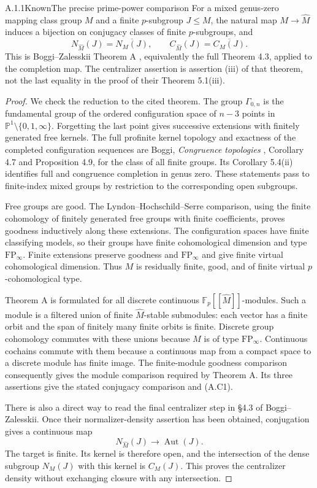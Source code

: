 \begin{result}{A.1.1}{Known}{The precise prime-power comparison}
For a mixed genus-zero mapping class group $M$ and a finite
$p$-subgroup $J\leq M$, the natural map $M\to\widehat M$ induces
a bijection on conjugacy classes of finite $p$-subgroups, and
\[
 N_{\widehat M}(J)=\overline{N_M(J)},\qquad
 C_{\widehat M}(J)=\overline{C_M(J)}.                    \tag{A.C1}
\]
This is Boggi--Zalesskii Theorem A \cite{CA_BZ2025}, equivalently the full
Theorem 4.3, applied to the completion map.  The centralizer assertion
is assertion (iii) of that theorem, not the last equality in the proof
of their Theorem 5.1(iii).
\end{result}
\begin{proof}
We check the reduction to the cited theorem.  The group
$\Gamma_{0,n}$ is the fundamental group of the ordered configuration
space of $n-3$ points in $\mathbb P^1\setminus\{0,1,\infty\}$.
Forgetting the last point gives successive extensions with finitely
generated free kernels.  The full profinite kernel topology and
exactness of the completed configuration sequences are
Boggi, \emph{Congruence topologies} \cite{CA_Boggi2020}, Corollary 4.7 and
Proposition 4.9, for the class of all finite groups.  Its
Corollary 5.4(ii) identifies full and congruence completion in genus
zero.  These statements pass to finite-index mixed groups by
restriction to the corresponding open subgroups.

Free groups are good.  The Lyndon--Hochschild--Serre comparison,
using the finite cohomology of finitely generated free groups with
finite coefficients, proves goodness inductively along these
extensions.  The configuration spaces have finite classifying
models, so their groups have finite cohomological dimension and type
$\mathrm{FP}_\infty$.  Finite extensions preserve goodness and
$\mathrm{FP}_\infty$ and give finite virtual cohomological dimension.
Thus $M$ is residually finite, good, and of finite virtual
$p$-cohomological type.

Theorem A is formulated for all discrete continuous
$\mathbb F_p[[\widehat M]]$-modules.  Such a module is a filtered
union of finite $\widehat M$-stable submodules: each vector has a
finite orbit and the span of finitely many finite orbits is finite.
Discrete group cohomology commutes with these unions because $M$ is
of type $\mathrm{FP}_\infty$.  Continuous cochains commute with them
because a continuous map from a compact space to a discrete module
has finite image.  The finite-module goodness comparison consequently
gives the module comparison required by Theorem A.  Its three
assertions give the stated conjugacy comparison and (A.C1).

There is also a direct way to read the final centralizer step in
\S4.3 of Boggi--Zalesskii.  Once their normalizer-density assertion
has been obtained, conjugation gives a continuous map
\[
 N_{\widehat M}(J)\longrightarrow\operatorname{Aut}(J).
\]
The target is finite.  Its kernel is therefore open, and the
intersection of the dense subgroup $N_M(J)$ with this kernel is
$C_M(J)$.  This proves the centralizer density without exchanging
closure with any intersection.
\end{proof}

